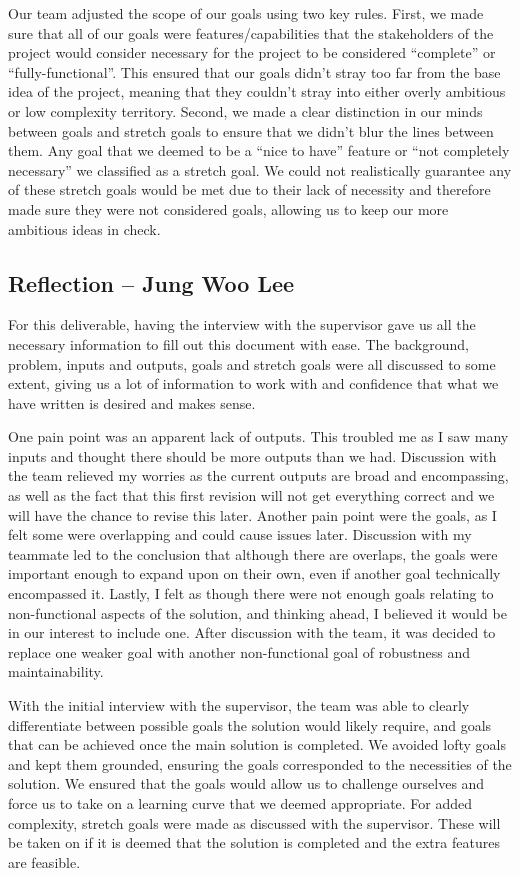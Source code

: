 \documentclass{article}
\begin{document}
Our team adjusted the scope of our goals using two key rules. First, we made
sure that all of our goals were features/capabilities that the stakeholders
of the project would consider necessary for the project to be considered
“complete” or “fully-functional”. This ensured that our goals didn’t stray too
far from the base idea of the project, meaning that they couldn’t stray into
either overly ambitious or low complexity territory. Second, we made a clear
distinction in our minds between goals and stretch goals to ensure that we
didn’t blur the lines between them. Any goal that we deemed to be a
“nice to have” feature or “not completely necessary” we classified as a stretch
goal. We could not realistically guarantee any of these stretch goals would be
met due to their lack of necessity and therefore made sure they were not
considered goals, allowing us to keep our more ambitious ideas in check.

\subsection*{Reflection -- Jung Woo Lee}

For this deliverable, having the interview with the supervisor gave us all the
necessary information to fill out this document with ease. The background, 
problem, inputs and outputs, goals and stretch goals were all discussed to 
some extent, giving us a lot of information to work with and confidence that 
what we have written is desired and makes sense. \newline

One pain point was an apparent lack of outputs. This troubled me as I saw many
inputs and thought there should be more outputs than we had. Discussion with the
team relieved my worries as the current outputs are broad and encompassing, as 
well as the fact that this first revision will not get everything correct and we
will have the chance to revise this later. Another pain point were the goals, as 
I felt some were overlapping and could cause issues later. Discussion with my 
teammate led to the conclusion that although there are overlaps, the goals were 
important enough to expand upon on their own, even if another goal technically 
encompassed it. Lastly, I felt as though there were not enough goals relating to 
non-functional aspects of the solution, and thinking ahead, I believed it would 
be in our interest to include one. After discussion with the team, it was decided 
to replace one weaker goal with another non-functional goal of robustness and 
maintainability. \newline

With the initial interview with the supervisor, the team was able to clearly 
differentiate between possible goals the solution would likely require, and goals
that can be achieved once the main solution is completed. We avoided lofty goals 
and kept them grounded, ensuring the goals corresponded to the necessities of the 
solution. We ensured that the goals would allow us to challenge ourselves and 
force us to take on a learning curve that we deemed appropriate. For added 
complexity, stretch goals were made as discussed with the supervisor. These will 
be taken on if it is deemed that the solution is completed and the extra features
are feasible.
\end{document}

